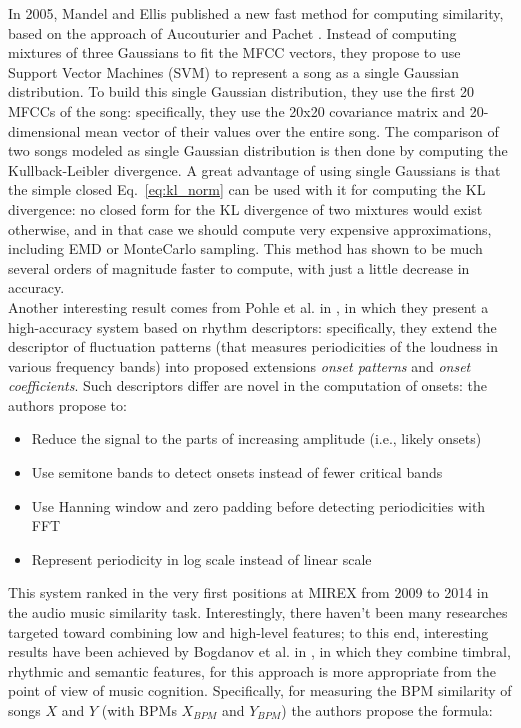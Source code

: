 In 2005, Mandel and Ellis published a new fast method for computing similarity, based on the approach of Aucouturier and Pachet \cite{mandel05}. Instead of computing mixtures of three Gaussians to fit the MFCC vectors, they propose to use Support Vector Machines (SVM) to represent a song as a single Gaussian distribution. To build this single Gaussian distribution, they use the first 20 MFCCs of the song: specifically, they use the 20x20 covariance matrix and 20-dimensional mean vector of their values over the entire song. The comparison of two songs modeled as single Gaussian distribution is then done by computing the Kullback-Leibler divergence. A great advantage of using single Gaussians is that the simple closed Eq.~\ref{eq:kl_norm} can be used with it for computing the KL divergence: no closed form for the KL divergence of two mixtures would exist otherwise, and in that case we should compute very expensive approximations, including EMD or MonteCarlo sampling. This method has shown to be much several orders of magnitude faster to compute, with just a little decrease in accuracy. \\ Another interesting result comes from Pohle et al. in \cite{pohle09}, in which they present a high-accuracy system based on rhythm descriptors: specifically, they extend the descriptor of fluctuation patterns (that measures periodicities of the loudness in various frequency bands) into proposed extensions \textit{onset patterns} and \textit{onset coefficients}. Such descriptors differ are novel in the computation of onsets: the authors propose to: 
\begin{itemize}
\item Reduce the signal to the parts of increasing amplitude (i.e., likely onsets)
\item Use semitone bands to detect onsets instead of fewer critical bands
\item Use Hanning window and zero padding before detecting periodicities with FFT
\item Represent periodicity in log scale instead of linear scale
\end{itemize}
This system ranked in the very first positions at MIREX from 2009 to 2014 in the audio music similarity task.  
Interestingly, there haven't been many researches targeted toward combining low and high-level features; to this end, interesting results have been achieved by Bogdanov et al. in \cite{dimi10}, in which they combine timbral, rhythmic and semantic features, for this approach is more appropriate from the point of view of music cognition. Specifically, for measuring the BPM similarity of songs $X$ and $Y$ (with BPMs $X_{BPM}$ and $Y_{BPM}$) the authors propose the formula:
